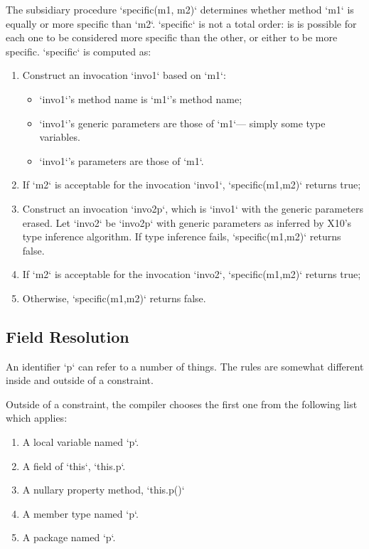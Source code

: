The subsidiary procedure \xcd`specific(m1, m2)` determines whether method
\xcd`m1` is equally or more specific than \xcd`m2`.  \xcd`specific` is not a
total order: is is possible for each one to be considered more specific than
the other, or either to be more specific.  \xcd`specific` is computed as: 
\begin{enumerate}
\item Construct an invocation \xcd`invo1` based on \xcd`m1`: 
      \begin{itemize}
      \item \xcd`invo1`'s method name is \xcd`m1`'s method name;
      \item \xcd`invo1`'s generic parameters are those of \xcd`m1`--- simply
            some type variables.
      \item \xcd`invo1`'s parameters are those of \xcd`m1`.
      \end{itemize}
\item If \xcd`m2` is acceptable for the invocation \xcd`invo1`,
      \xcd`specific(m1,m2)` returns true; 
\item Construct an invocation \xcd`invo2p`, which is \xcd`invo1` with the
      generic parameters erased.  Let \xcd`invo2` be \xcd`invo2p` with generic
      parameters as inferred by X10's type inference algorithm.  If type
      inference fails, \xcd`specific(m1,m2)` returns false.
\item If \xcd`m2` is acceptable for the invocation \xcd`invo2`,
      \xcd`specific(m1,m2)` returns true; 
\item Otherwise, \xcd`specific(m1,m2)` returns false.
\end{enumerate}

\subsection{Field Resolution}

An identifier \xcd`p` can refer to a number of things.  The rules are somewhat
different inside and outside of a constraint.

Outside of a constraint, the compiler chooses
the first one from the following list which applies: 
\begin{enumerate}
\item A local variable named \xcd`p`.
\item A field of \xcd`this`, \viz{} \xcd`this.p`.
\item A nullary property method, \xcd`this.p()`
\item A member type named \xcd`p`.
\item A package named \xcd`p`.
\end{enumerate}

